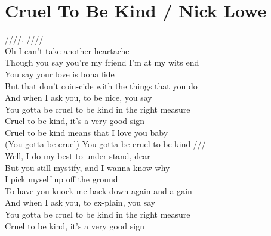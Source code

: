 \section{Cruel To Be Kind / Nick Lowe}\label{sec:crueltobekind}

  \Amajor
  \Aseven
  \Aminor
  \Cmajor
  \Dminor
  \Eminor
  \Fmajor
  \Gmajor
  \Gseven
  \GsevenSusFour

  
////, ////\\
Oh  I can't take another  heartache\\
Though you  say you're my friend  I'm at my wits end\\
 You say your love is  bona fide\\
But that  don't coin-cide  with the things that you  do\\
And when I  ask you, to be  nice, you  say\\
You gotta be  cruel to be  kind  in the right  measure\\
 Cruel to be  kind, it's a  very good  sign\\
 Cruel to be  kind  means that I  love you  baby\\
(You  gotta be cruel) You  gotta be cruel to be  kind ///\\
Well, I  do my best to under-stand, dear\\
But you  still mystify, and  I wanna know why\\
 I pick myself up  off the ground\\
To have you  knock me  back down  again and a-gain\\
And when I  ask you, to ex-plain, you  say\\
You gotta be  cruel to be  kind  in the right  measure\\
 Cruel to be  kind, it's a  very good  sign\\

